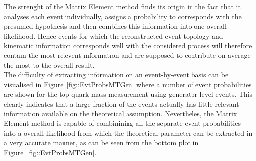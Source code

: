 The strenght of the Matrix Element method finds its origin in the fact that it analyses each event individually, assigns a probability to corresponds with the presumed hypothesis and then combines this information into one overall likelihood.
Hence events for which the reconstructed event topology and kinematic information corresponds well with the considered process will therefore contain the most relevent information and are supposed to contribute on average the most to the overall result.
\\
The difficulty of extracting information on an event-by-event basis can be visualised in Figure~\ref{fig::EvtProbsMTGen} where a number of event probabilities are shown for the top-quark mass measurement using generator-level events. This clearly indicates that a large fraction of the events actually has little relevant information available on the theoretical assumption.
Nevertheles, the Matrix Element method is capable of combinining all the separate event probabilities into a overall likelihood from which the theoretical parameter can be extracted in a very accurate manner, as can be seen from the bottom plot in Figure~\ref{fig::EvtProbsMTGen}.
\\
